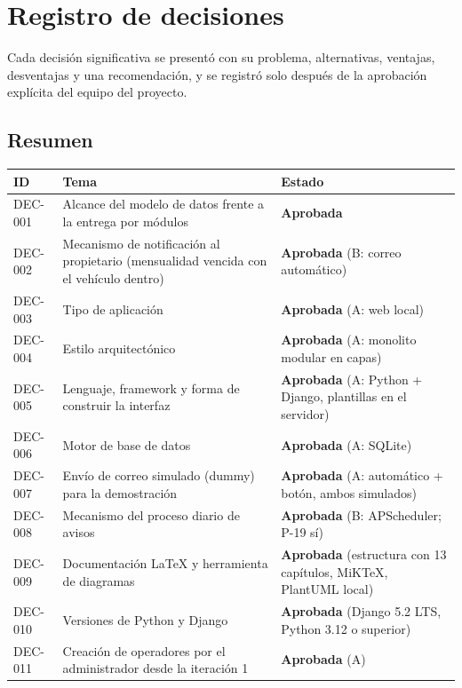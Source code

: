 
\chapter{Registro de decisiones}\label{cap:decisiones}

Cada decisión significativa se presentó con su problema, alternativas, ventajas, desventajas y una recomendación, y se registró solo después de la aprobación explícita del equipo del proyecto.

\section{Resumen}
\begin{longtable}{>{\raggedright\arraybackslash}p{1.8cm}>{\raggedright\arraybackslash}p{7.0cm}>{\raggedright\arraybackslash}p{5.6cm}}
\toprule
\textbf{ID} & \textbf{Tema} & \textbf{Estado}\\
\midrule\endhead
DEC-001 & Alcance del modelo de datos frente a la entrega por módulos & \textbf{Aprobada}\\
DEC-002 & Mecanismo de notificación al propietario (mensualidad vencida con el vehículo dentro) & \textbf{Aprobada} (B: correo automático)\\
DEC-003 & Tipo de aplicación & \textbf{Aprobada} (A: web local)\\
DEC-004 & Estilo arquitectónico & \textbf{Aprobada} (A: monolito modular en capas)\\
DEC-005 & Lenguaje, framework y forma de construir la interfaz & \textbf{Aprobada} (A: Python + Django, plantillas en el servidor)\\
DEC-006 & Motor de base de datos & \textbf{Aprobada} (A: SQLite)\\
DEC-007 & Envío de correo simulado (dummy) para la demostración & \textbf{Aprobada} (A: automático + botón, ambos simulados)\\
DEC-008 & Mecanismo del proceso diario de avisos & \textbf{Aprobada} (B: APScheduler; P-19 sí)\\
DEC-009 & Documentación LaTeX y herramienta de diagramas & \textbf{Aprobada} (estructura con 13 capítulos, MiKTeX, PlantUML local)\\
DEC-010 & Versiones de Python y Django & \textbf{Aprobada} (Django 5.2 LTS, Python 3.12 o superior)\\
DEC-011 & Creación de operadores por el administrador desde la iteración 1 & \textbf{Aprobada} (A)\\

\end{longtable}
